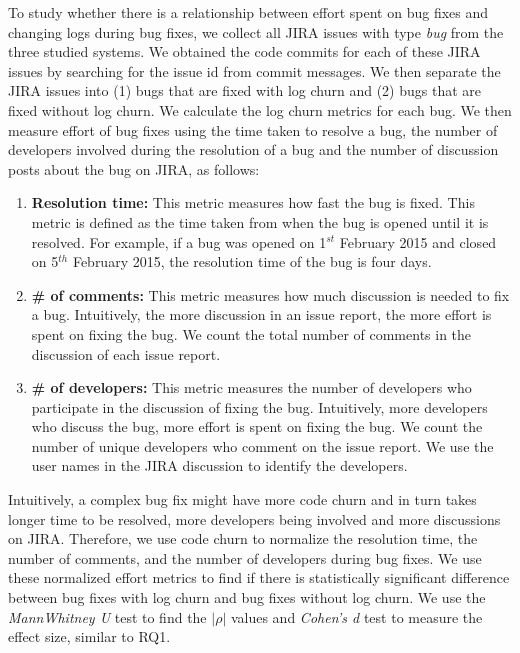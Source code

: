 To study whether there is a relationship between effort spent on bug fixes and changing logs during bug fixes, we collect all JIRA issues with type \emph{bug} from the three studied systems. We obtained the code commits for each of these JIRA issues by searching for the issue id from commit messages. We then separate the JIRA issues into (1) bugs that are fixed with log churn and (2) bugs that are fixed without log churn. We calculate the log churn metrics for each bug.  We then measure effort of bug fixes using the time taken to resolve a bug, the number of developers involved during the resolution of a bug and the number of discussion posts about the bug on JIRA, as follows:
\begin{enumerate}
	\item \textbf{Resolution time:} This metric measures how fast the bug is fixed. This metric is defined as the time taken from when the bug is opened until it is resolved. For example, if a bug was opened on 1$ ^{st}$ February 2015 and closed on 5$ ^{th}$ February 2015, the resolution time of the bug is four days. 
	
	\item \textbf {\# of comments:} This metric measures how much discussion is needed to fix a bug. Intuitively, the more discussion in an issue report, the more effort is spent on fixing the bug. We count the total number of comments in the discussion of each issue report.
	
	\item \textbf {\# of developers:} This metric measures the number of developers who participate in the discussion of fixing the bug. Intuitively, more developers who discuss the bug, more effort is spent on fixing the bug. We count the number of unique developers who comment on the issue report. We use the user names in the JIRA discussion to identify the developers. 
\end{enumerate}
Intuitively, a complex bug fix might have more code churn and in turn takes longer time to be resolved, more developers being involved and more discussions on JIRA. Therefore, we use code churn to normalize the resolution time, the number of comments, and the number of developers during bug fixes. We use these normalized effort metrics to find if there is statistically significant difference between bug fixes with log churn and bug fixes without log churn. We use the {\em MannWhitney U} test to find the $|\rho|$ values and \textsl{Cohen's d} test to measure the effect size, similar to RQ1. 

